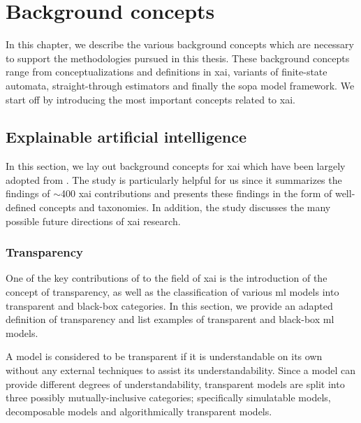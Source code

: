 \chapter{Background concepts}

\label{chapter:background}

In this chapter, we describe the various background concepts which are necessary
to support the methodologies pursued in this thesis. These background concepts
range from conceptualizations and definitions in \ac{xai}, variants of
finite-state automata, straight-through estimators and finally the \ac{sopa} model
framework. We start off by introducing the most important concepts related to
\ac{xai}.

\section{Explainable artificial intelligence}

\label{section:xai}

In this section, we lay out background concepts for \ac{xai} which have been
largely adopted from \citet{arrieta2020explainable}. The study is particularly
helpful for us since it summarizes the findings of $\sim$400 \ac{xai}
contributions and presents these findings in the form of well-defined concepts
and taxonomies. In addition, the study discusses the many possible future
directions of \ac{xai} research.

\subsection{Transparency}

One of the key contributions of \citet{arrieta2020explainable} to the field of
\ac{xai} is the introduction of the concept of transparency, as well as the
classification of various \ac{ml} models into transparent and
black-box categories. In this section, we provide an adapted definition of
transparency and list examples of transparent and black-box \ac{ml} models.

\begin{definition}
  A model is considered to be transparent if it is understandable on its own
  without any external techniques to assist its understandability. Since a model
  can provide different degrees of understandability, transparent models are
  split into three possibly mutually-inclusive categories; specifically
  simulatable models, decomposable models and algorithmically transparent
  models.
\end{definition}

